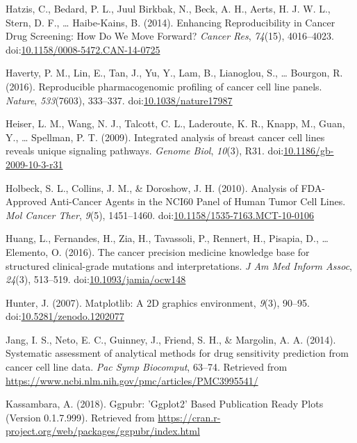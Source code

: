 \documentclass[man,floatsintext]{apa6}
\begin{document}
\hypertarget{ref-hatzis2014}{}
Hatzis, C., Bedard, P. L., Juul Birkbak, N., Beck, A. H., Aerts, H. J.
W. L., Stern, D. F., \ldots{} Haibe-Kains, B. (2014). Enhancing
Reproducibility in Cancer Drug Screening: How Do We Move Forward?
\emph{Cancer Res}, \emph{74}(15), 4016--4023.
doi:\href{https://doi.org/10.1158/0008-5472.CAN-14-0725}{10.1158/0008-5472.CAN-14-0725}

\hypertarget{ref-haverty2016}{}
Haverty, P. M., Lin, E., Tan, J., Yu, Y., Lam, B., Lianoglou, S.,
\ldots{} Bourgon, R. (2016). Reproducible pharmacogenomic profiling of
cancer cell line panels. \emph{Nature}, \emph{533}(7603), 333--337.
doi:\href{https://doi.org/10.1038/nature17987}{10.1038/nature17987}

\hypertarget{ref-heiser2009}{}
Heiser, L. M., Wang, N. J., Talcott, C. L., Laderoute, K. R., Knapp, M.,
Guan, Y., \ldots{} Spellman, P. T. (2009). Integrated analysis of breast
cancer cell lines reveals unique signaling pathways. \emph{Genome Biol},
\emph{10}(3), R31.
doi:\href{https://doi.org/10.1186/gb-2009-10-3-r31}{10.1186/gb-2009-10-3-r31}

\hypertarget{ref-holbeck2010}{}
Holbeck, S. L., Collins, J. M., \& Doroshow, J. H. (2010). Analysis of
FDA-Approved Anti-Cancer Agents in the NCI60 Panel of Human Tumor Cell
Lines. \emph{Mol Cancer Ther}, \emph{9}(5), 1451--1460.
doi:\href{https://doi.org/10.1158/1535-7163.MCT-10-0106}{10.1158/1535-7163.MCT-10-0106}

\hypertarget{ref-huang2016}{}
Huang, L., Fernandes, H., Zia, H., Tavassoli, P., Rennert, H., Pisapia,
D., \ldots{} Elemento, O. (2016). The cancer precision medicine
knowledge base for structured clinical-grade mutations and
interpretations. \emph{J Am Med Inform Assoc}, \emph{24}(3), 513--519.
doi:\href{https://doi.org/10.1093/jamia/ocw148}{10.1093/jamia/ocw148}

\hypertarget{ref-hunter2007}{}
Hunter, J. (2007). Matplotlib: A 2D graphics environment, \emph{9}(3),
90--95.
doi:\href{https://doi.org/10.5281/zenodo.1202077}{10.5281/zenodo.1202077}

\hypertarget{ref-jang2014}{}
Jang, I. S., Neto, E. C., Guinney, J., Friend, S. H., \& Margolin, A. A.
(2014). Systematic assessment of analytical methods for drug sensitivity
prediction from cancer cell line data. \emph{Pac Symp Biocomput},
63--74. Retrieved from
\url{https://www.ncbi.nlm.nih.gov/pmc/articles/PMC3995541/}

\hypertarget{ref-kassambara2018}{}
Kassambara, A. (2018). Ggpubr: 'Ggplot2' Based Publication Ready Plots
(Version 0.1.7.999). Retrieved from
\url{https://cran.r-project.org/web/packages/ggpubr/index.html}
\end{document}
